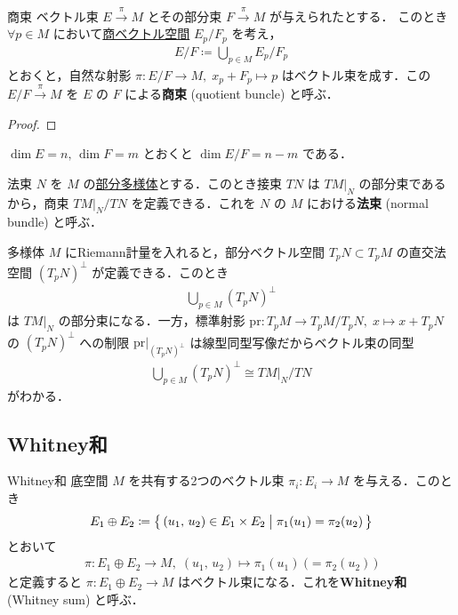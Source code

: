 \documentclass[geometry_main]{subfiles}
\begin{document}
\begin{mydef}[label=def.quo-VB]{商束}
	ベクトル束 $E \xrightarrow{\pi} M$ とその部分束 $F \xrightarrow{\pi} M$ が与えられたとする．
	このとき $\forall p \in M$ において\hyperref[prop:quotient-vec]{商ベクトル空間} $E_p / F_p$ を考え，
	\begin{align}
		E/F \coloneqq \bigcup_{p \in M} E_p/F_p
	\end{align}
	とおくと，自然な射影 $\pi \colon E/F \to M,\; x_p + F_p \mapsto p$ はベクトル束を成す．この $E/F \xrightarrow{\pi} M$ を $E$ の $F$ による\textbf{商束} (quotient buncle) と呼ぶ．
\end{mydef}

\begin{proof}
	
\end{proof}

$\dim E = n,\, \dim F = m$ とおくと $\dim E/F = n-m$ である．

\begin{mydef}[label=def.normal-bundle]{法束}
	$N$ を $M$ の\hyperref[def.submani]{\cinfty 部分多様体}とする．このとき接束 $TN$ は $TM|_N$ の部分束であるから，商束 $TM|_N / TN$ を定義できる．これを $N$ の $M$ における\textbf{法束} (normal bundle) と呼ぶ．
\end{mydef}

\cinfty 多様体 $M$ にRiemann計量を入れると，部分ベクトル空間 $T_pN \subset T_pM$ の直交法空間 $(T_pN)^{\bot}$ が定義できる．このとき
\begin{align}
	\bigcup_{p \in M} (T_pN)^\bot
\end{align}
は $TM|_N$ の部分束になる．一方，標準射影 $\mathrm{pr} \colon T_pM \to T_pM/T_pN,\; x \mapsto x + T_pN$ の  $(T_pN)^{\bot}$ への制限 $\mathrm{pr}|_{(T_pN)^{\bot}}$ は線型同型写像だからベクトル束の同型
\begin{align}
	\bigcup_{p \in M} (T_pN)^\bot \cong TM|_N/TN
\end{align}
がわかる．

\subsection{Whitney和}

\begin{mydef}[label=def.Whitney-sum]{Whitney和}
	底空間 $M$ を共有する2つのベクトル束 $\pi_i \colon E_i \to M$ を与える．このとき
	\begin{align}
		E_1 \oplus E_2 \coloneqq \bigl\{\, (u_1,\, u_2) \in E_1 \times E_2 \bigm| \pi_1(u_1) = \pi_2(u_2)  \,\bigr\} 
	\end{align}
	とおいて
	\begin{align}
		\pi \colon E_1 \oplus E_2 \to M,\; (u_1,\, u_2) \mapsto \pi_1(u_1)\; \bigl(= \pi_2(u_2)\, \bigr)
	\end{align}
	と定義すると $\pi \colon E_1 \oplus E_2 \to M$ はベクトル束になる．これを\textbf{Whitney和} (Whitney sum) と呼ぶ．
\end{mydef}
\end{document}
